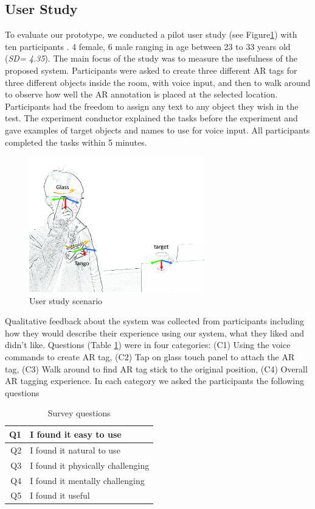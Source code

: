 \subsection{User Study }

To evaluate our prototype, we conducted a pilot user study (see Figure\ref{fig:mgia16:scenario}) with ten participants . 4 female, 6 male ranging in age between 23 to 33 years old (\textit{SD= 4.35}). The main focus of the study was to measure the usefulness of the proposed system. Participants were asked to create three different AR tags for three different objects inside the room, with voice input, and then to walk around to observe how well the AR annotation is placed at the selected location. Participants had the freedom to assign any text to any object they wish in the test. The experiment conductor explained the tasks before the experiment and gave examples of target objects and names to use for voice input. All participants completed the tasks within 5 minutes. 

\begin{figure}[ht]
  \centering
  \includegraphics[width=3in]{images/mgia16/axis_lo}
  \caption{User study scenario}
  \label{fig:mgia16:scenario}
\end{figure}

Qualitative feedback about the system was collected from participants including how they would describe their experience using our system, what they liked and didn't like. Questions (Table \ref{table:questions}) were in four categories: (C1) Using the voice commands to create AR tag, (C2) Tap on glass touch panel to attach the AR tag, (C3)  Walk around to find AR tag stick to the original position, (C4) Overall AR tagging experience. In each category we asked the participants the following questions

\begin{table}[ht]
  \centering
	\caption{Survey questions}
    \label{table:questions}
    \begin{tabular}{r l}
    \hline
    Q1 & I found it easy to use \\ \hline
    Q2 & I found it natural to use \\ \hline
    Q3 & I found it physically challenging \\ \hline
    Q4 & I found it mentally challenging \\ \hline
    Q5 & I found it useful \\ \hline
    \end{tabular}
\end{table}

